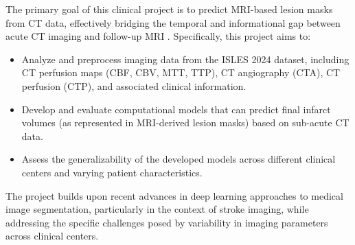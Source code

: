 The primary goal of this clinical project is to predict MRI-based lesion masks from CT data, effectively bridging the temporal and informational gap between acute CT imaging and follow-up MRI \cite{riedel2024isles}. Specifically, this project aims to:

\begin{itemize}
    \item Analyze and preprocess imaging data from the ISLES 2024 dataset, including CT perfusion maps (CBF, CBV, MTT, TTP), CT angiography (CTA), CT perfusion (CTP), and associated clinical information\cite{riedel2024isles}.
    
    \item Develop and evaluate computational models that can predict final infarct volumes (as represented in MRI-derived lesion masks) based on sub-acute CT data\cite{riedel2024isles}.
    
    \item Assess the generalizability of the developed models across different clinical centers and varying patient characteristics.
    
\end{itemize}
The project builds upon recent advances in deep learning approaches to medical image segmentation, particularly in the context of stroke imaging, while addressing the specific challenges posed by variability in imaging parameters across clinical centers.
